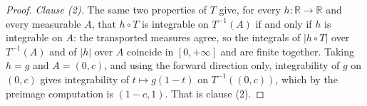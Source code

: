 \begin{proof}
\emph{Clause (2).}  The same two properties of $T$ give, for every
$h : \mathbb{R} \to \mathbb{R}$ and every measurable $A$, that $h \circ T$ is
integrable on $T^{-1}(A)$ if and only if $h$ is integrable on $A$: the
transported measures agree, so the integrals of $|h \circ T|$ over $T^{-1}(A)$
and of $|h|$ over $A$ coincide in $[0,+\infty]$ and are finite together.  Taking
$h = g$ and $A = (0,c)$, and using the forward direction only, integrability of
$g$ on $(0,c)$ gives integrability of $t \mapsto g(1-t)$ on $T^{-1}((0,c))$,
which by the preimage computation is $(1-c,1)$.  That is clause (2).
\end{proof}
